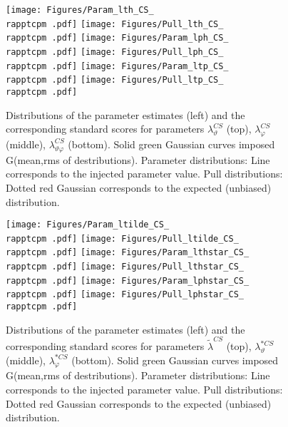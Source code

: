 \documentclass[12pt]{article}
\newcommand{\lamthCS}{\lambda^{\scriptscriptstyle CS}_\vartheta}
\newcommand{\lamphCS}{\lambda^{\scriptscriptstyle CS}_\varphi}
\newcommand{\lamthphCS}{\lambda^{\scriptscriptstyle CS}_{\vartheta \varphi}}
\newcommand{\lamtildeCS}{\tilde{\lambda}^{\scriptscriptstyle CS}}
\newcommand{\lamthstarCS}{\lambda^{* \scriptscriptstyle CS}_\vartheta}
\newcommand{\lamphstarCS}{\lambda^{* \scriptscriptstyle CS}_\varphi}
\providecommand{\rapptcpm}[1]{rap1pt1cpm1}%
\begin{document}




\begin{figure}[htbp]
\centering
\texttt{[image: Figures/Param\_lth\_CS\_\\rapptcpm .pdf]}
\texttt{[image: Figures/Pull\_lth\_CS\_\\rapptcpm .pdf]}
\texttt{[image: Figures/Param\_lph\_CS\_\\rapptcpm .pdf]}
\texttt{[image: Figures/Pull\_lph\_CS\_\\rapptcpm .pdf]}
\texttt{[image: Figures/Param\_ltp\_CS\_\\rapptcpm .pdf]}
\texttt{[image: Figures/Pull\_ltp\_CS\_\\rapptcpm .pdf]}
\caption{Distributions of the parameter estimates (left) and the corresponding
standard scores for parameters $\lamthCS$ (top), $\lamphCS$ (middle),
$\lamthphCS$ (bottom). Solid green Gaussian curves imposed G(mean,rms of
destributions). Parameter distributions: Line corresponds to the injected parameter value.
Pull distributions: Dotted red Gaussian corresponds to the expected
(unbiased) distribution.}
\end{figure}
\clearpage

\begin{figure}[htbp]
\centering
\texttt{[image: Figures/Param\_ltilde\_CS\_\\rapptcpm .pdf]}
\texttt{[image: Figures/Pull\_ltilde\_CS\_\\rapptcpm .pdf]}
\texttt{[image: Figures/Param\_lthstar\_CS\_\\rapptcpm .pdf]}
\texttt{[image: Figures/Pull\_lthstar\_CS\_\\rapptcpm .pdf]}
\texttt{[image: Figures/Param\_lphstar\_CS\_\\rapptcpm .pdf]}
\texttt{[image: Figures/Pull\_lphstar\_CS\_\\rapptcpm .pdf]}
\caption{Distributions of the parameter estimates (left) and the corresponding
standard scores for parameters $\lamtildeCS$ (top), $\lamthstarCS$ (middle),
$\lamphstarCS$ (bottom). Solid green Gaussian curves imposed G(mean,rms of
destributions). Parameter distributions: Line corresponds to the injected parameter value.
Pull distributions: Dotted red Gaussian corresponds to the expected
(unbiased) distribution.}
\end{figure}
\clearpage





\end{document}
